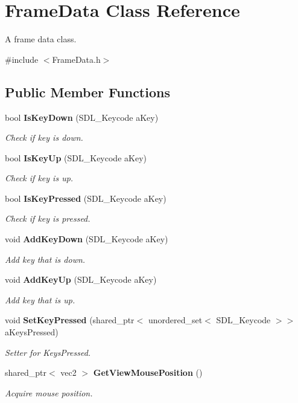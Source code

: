\section{Frame\+Data Class Reference}
\label{class_frame_data}


A frame data class.  




{\ttfamily \#include $<$Frame\+Data.\+h$>$}

\subsection*{Public Member Functions}
\begin{DoxyCompactItemize}
\item 
bool \textbf{ Is\+Key\+Down} (S\+D\+L\+\_\+\+Keycode a\+Key)
\begin{DoxyCompactList}\small\item\em Check if key is down. \end{DoxyCompactList}\item 
bool \textbf{ Is\+Key\+Up} (S\+D\+L\+\_\+\+Keycode a\+Key)
\begin{DoxyCompactList}\small\item\em Check if key is up. \end{DoxyCompactList}\item 
bool \textbf{ Is\+Key\+Pressed} (S\+D\+L\+\_\+\+Keycode a\+Key)
\begin{DoxyCompactList}\small\item\em Check if key is pressed. \end{DoxyCompactList}\item 
void \textbf{ Add\+Key\+Down} (S\+D\+L\+\_\+\+Keycode a\+Key)
\begin{DoxyCompactList}\small\item\em Add key that is down. \end{DoxyCompactList}\item 
void \textbf{ Add\+Key\+Up} (S\+D\+L\+\_\+\+Keycode a\+Key)
\begin{DoxyCompactList}\small\item\em Add key that is up. \end{DoxyCompactList}\item 
void \textbf{ Set\+Key\+Pressed} (shared\+\_\+ptr$<$ unordered\+\_\+set$<$ S\+D\+L\+\_\+\+Keycode $>$$>$ a\+Keys\+Pressed)
\begin{DoxyCompactList}\small\item\em Setter for Keys\+Pressed. \end{DoxyCompactList}\item 
shared\+\_\+ptr$<$ vec2 $>$ \textbf{ Get\+View\+Mouse\+Position} ()
\begin{DoxyCompactList}\small\item\em Acquire mouse position. \end{DoxyCompactList}\end{DoxyCompactItemize}
